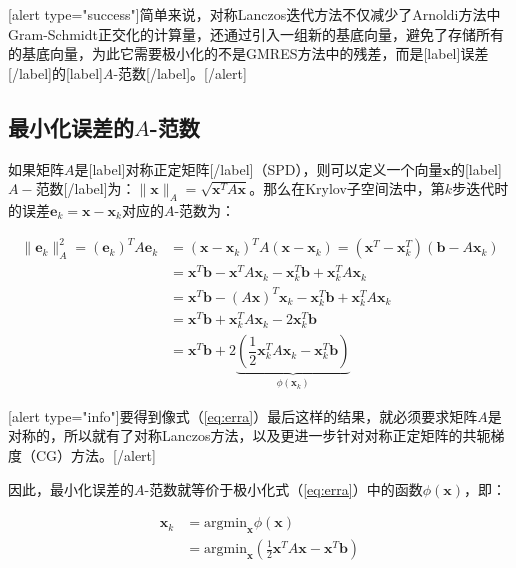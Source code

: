\documentclass[UTF8,nofonts]{ctexart}
\begin{document}
[alert type="success"]简单来说，对称Lanczos迭代方法不仅减少了Arnoldi方法中Gram-Schmidt正交化的计算量，还通过引入一组新的基底向量，避免了存储所有的基底向量，为此它需要极小化的不是GMRES方法中的残差，而是[label]误差[/label]的[label]$A$-范数[/label]。[/alert]



\subsection*{最小化误差的$A$-范数}

如果矩阵$A$是[label]对称正定矩阵[/label]（SPD），则可以定义一个向量$\boldsymbol{x}$的[label]$A-$范数[/label]为：$\|\boldsymbol{x}\|_A=\sqrt{\boldsymbol{x}^TA\boldsymbol{x}}$。那么在Krylov子空间法中，第$k$步迭代时的误差$\boldsymbol{e}_k=\boldsymbol{x}-\boldsymbol{x}_k$对应的$A$-范数为：

\begin{equation}
	\label{eq:erra}
	\begin{aligned}
		\|\boldsymbol{e}_k\|_A^2=(\boldsymbol{e}_k)^TA\boldsymbol{e}_k
		&=(\boldsymbol{x}-\boldsymbol{x}_k)^TA(\boldsymbol{x}-\boldsymbol{x}_k)
		=(\boldsymbol{x}^T-\boldsymbol{x}_k^T)(\boldsymbol{b}-A\boldsymbol{x}_k) \\
		&=\boldsymbol{x}^T\boldsymbol{b}-\boldsymbol{x}^TA\boldsymbol{x}_k-\boldsymbol{x}_k^T\boldsymbol{b}+\boldsymbol{x}^T_kA\boldsymbol{x}_k \\
		&=\boldsymbol{x}^T\boldsymbol{b}-(A\boldsymbol{x})^T\boldsymbol{x}_k-\boldsymbol{x}_k^T\boldsymbol{b}+\boldsymbol{x}_k^TA\boldsymbol{x}_k \\
		&=\boldsymbol{x}^T\boldsymbol{b}+\boldsymbol{x}_k^TA\boldsymbol{x}_k-2\boldsymbol{x}_k^T\boldsymbol{b} \\
		&=\boldsymbol{x}^T\boldsymbol{b}+2
		\underbrace{
			\left(
				\dfrac{1}{2}\boldsymbol{x}_k^TA\boldsymbol{x}_k-\boldsymbol{x}_k^T\boldsymbol{b}
			\right)
		}_{\phi(\boldsymbol{x}_k)}
	\end{aligned}
\end{equation}

[alert type="info"]要得到像式（\ref{eq:erra}）最后这样的结果，就必须要求矩阵$A$是对称的，所以就有了对称Lanczos方法，以及更进一步针对对称正定矩阵的共轭梯度（CG）方法。[/alert]

因此，最小化误差的$A$-范数就等价于极小化式（\ref{eq:erra}）中的函数$\phi(\boldsymbol{x})$，即：

\begin{equation}
	\label{eq:xk}
	\begin{aligned}
		\boldsymbol{x}_k
		&=\text{argmin}_{\boldsymbol{x}}\phi(\boldsymbol{x}) \\
		&=\text{argmin}_{\boldsymbol{x}}\left(
			\frac{1}{2}\boldsymbol{x}^TA\boldsymbol{x}-\boldsymbol{x}^T\boldsymbol{b}
		\right)
	\end{aligned}
\end{equation}
\end{document}
